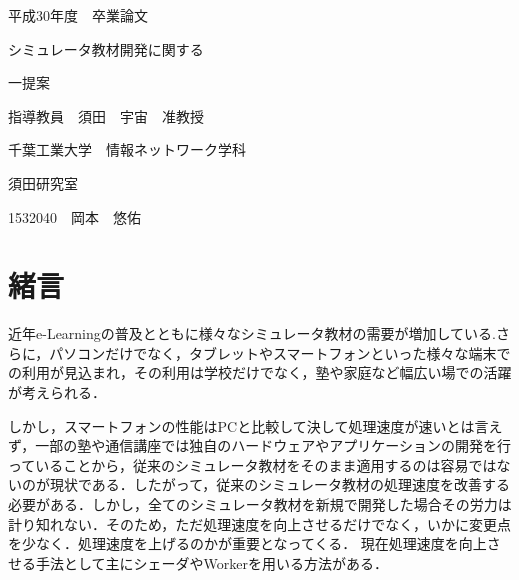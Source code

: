 \documentclass[a4j,12pt]{jsarticle}
\begin{document}
\begin{titlepage}
\begin{center}
\begin{LARGE}
平成30年度　卒業論文
\end{LARGE}

\vspace{20mm}
\begin{Huge}
シミュレータ教材開発に関する

一提案
\end{Huge}

\vspace{40mm}
\begin{LARGE}
指導教員　須田　宇宙　准教授


\vspace{15mm}
千葉工業大学　情報ネットワーク学科

須田研究室

\vspace{20mm}
1532040　岡本　悠佑
\end{LARGE}
\end{center}


\vspace{35mm}
\begin{LARGE}
 \end{LARGE}
 
\end{titlepage}
\newpage


\setcounter{page}{1} %
\setcounter{tocdepth}{3}
\tableofcontents
\clearpage
\listoffigures
\clearpage
\listoftables
\clearpage

\newpage
{}
\setcounter{page}{1} 
\section{緒言}
近年e-Learningの普及とともに様々なシミュレータ教材の需要が増加している.さらに，パソコンだけでなく，タブレットやスマートフォンといった様々な端末での利用が見込まれ，その利用は学校だけでなく，塾や家庭など幅広い場での活躍が考えられる．

しかし，スマートフォンの性能はPCと比較して決して処理速度が速いとは言えず，一部の塾や通信講座では独自のハードウェアやアプリケーションの開発を行っていることから，従来のシミュレータ教材をそのまま適用するのは容易ではないのが現状である．したがって，従来のシミュレータ教材の処理速度を改善する必要がある．しかし，全てのシミュレータ教材を新規で開発した場合その労力は計り知れない．そのため，ただ処理速度を向上させるだけでなく，いかに変更点を少なく．処理速度を上げるのかが重要となってくる．
現在処理速度を向上させる手法として主にシェーダやWorkerを用いる方法がある．
\end{document}
